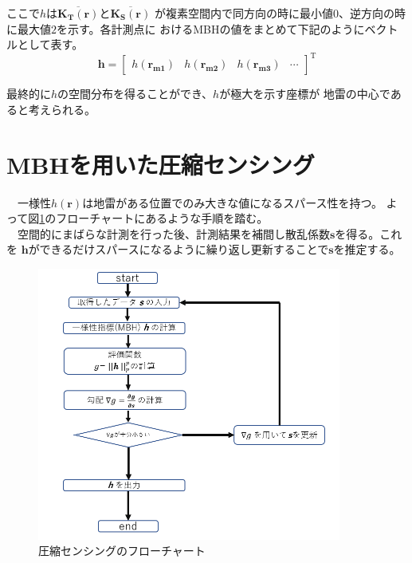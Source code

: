 \documentclass[12pt,a4paper]{jsreport}
\begin{document}
ここで$h$は$\overline{\bm{K_T(\bm{r})}}$と$\overline{\bm{K_S(\bm{r})}}$
が複素空間内で同方向の時に最小値$0$、逆方向の時に最大値$2$を示す。各計測点に
おけるMBHの値をまとめて下記のようにベクトルとして表す。
\begin{equation}
  \bm{h} =
      \left[
      \begin{array}{rrrr}
      h(\bm{r_{m1}})&h(\bm{r_{m2}})&h(\bm{r_{m3}})&\cdots
      \end{array}
      \right]^\mathrm{T}
      \label{mbh1}
  \end{equation}

  最終的に$h$の空間分布を得ることができ、$h$が極大を示す座標が
  地雷の中心であると考えられる。

  \section{MBHを用いた圧縮センシング}
  　一様性$h(\bm{r})$は地雷がある位置でのみ大きな値になるスパース性を持つ。
  よって図\ref{圧縮センシングのフローチャート}のフローチャートにあるような手順を踏む。
  \\　空間的にまばらな計測を行った後、計測結果を補間し散乱係数$\bm{s}$を得る。これを
  $\bm{h}$ができるだけスパースになるように繰り返し更新することで$\bm{s}$を推定する。


  \begin{figure}[h]
    \begin{center}
     \includegraphics[width=10cm]{./slide_image/imai_flowchart.png}
    \caption{圧縮センシングのフローチャート}\label{圧縮センシングのフローチャート}
    \end{center}
    \end{figure}
\end{document}

